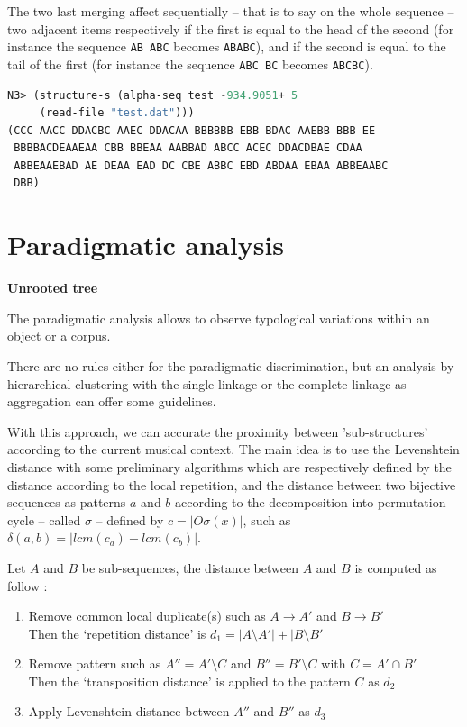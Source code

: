 The two last merging affect sequentially -- that is to say on the whole sequence -- two adjacent items respectively if the first is equal to the head of the second (for instance the sequence \texttt{AB ABC} becomes \texttt{ABABC}), and if the second is equal to the tail of the first (for instance the sequence \texttt{ABC BC} becomes \texttt{ABCBC}).

\begin{lstlisting}[language=Lisp]
N3> (structure-s (alpha-seq test -934.9051+ 5  
     (read-file "test.dat"))) 
(CCC AACC DDACBC AAEC DDACAA BBBBBB EBB BDAC AAEBB BBB EE
 BBBBACDEAAEAA CBB BBEAA AABBAD ABCC ACEC DDACDBAE CDAA
 ABBEAAEBAD AE DEAA EAD DC CBE ABBC EBD ABDAA EBAA ABBEAABC 
 DBB)
\end{lstlisting}

\section{Paradigmatic analysis}
\label{paradigm}

\textbf{Unrooted tree}
\smallskip

The paradigmatic analysis allows to observe typological variations within an object or a corpus.

There are no rules either for the paradigmatic discrimination, but an analysis by hierarchical clustering with the single linkage or the complete linkage as aggregation can offer some guidelines.

With this approach, we can accurate the proximity between 'sub-structures' according to the current musical context. The main idea is to use the Levenshtein distance with some preliminary algorithms which are respectively defined by the distance according to the local repetition, and the distance between two bijective sequences as patterns $a$ and $b$ according to the decomposition into permutation cycle \citep{pc} -- called $\sigma$ -- defined by $c = | O\sigma(x) |$, such as $\delta(a,b) = | lcm(c_a) - lcm(c_b) |$.

\smallskip

Let $A$ and $B$ be sub-sequences, the distance between $A$ and $B$ is computed as follow :
\begin{enumerate}
  \item Remove common local duplicate(s) such as $A \rightarrow A'$ and $B \rightarrow B'$\\ Then the `repetition distance' is $d_1 = | A \setminus A' | + | B \setminus B' |$
  \item Remove pattern such as $A'' = A' \setminus C$ and $B'' = B' \setminus C$ with $C = A' \cap B'$\\ Then the `transposition distance' is applied to the pattern $C$ as $d_2$
  \item Apply Levenshtein distance between $A''$ and $B''$ as $d_3$
\end{enumerate}


